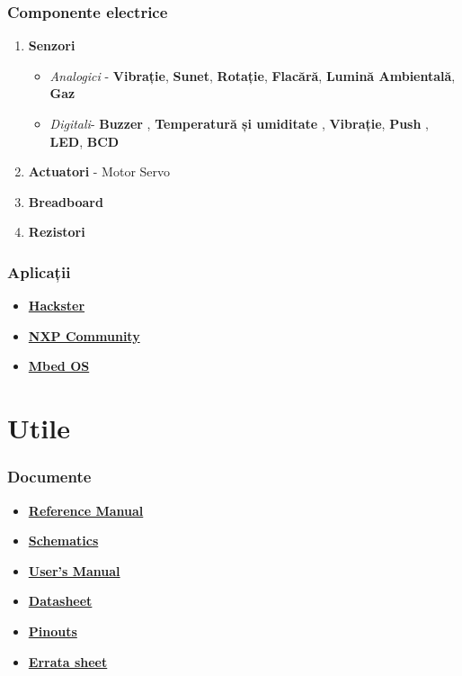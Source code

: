 \documentclass[xcolor={table}]{beamer}
\begin{document}
		\begin{frame}
			\frametitle{Componente electrice}
			\begin{enumerate}
				\item \textbf{Senzori}
					\begin{itemize}
				        \item \textit{Analogici} - 
				        \textbf{Vibrație},
				        \textbf{Sunet}, 
				        \textbf{Rotație}, 
				        \textbf{Flacără}, 
				        \textbf{Lumină Ambientală},
				        \textbf{Gaz}
				        \item \textit{Digitali}-
				        \textbf{Buzzer} ,
				        \textbf{Temperatură și umiditate} ,
				        \textbf{Vibrație}, 
				        \textbf{Push} ,
				        \textbf{LED},
				        \textbf{BCD} 
			        \end{itemize}
			    \item \textbf{Actuatori} - Motor Servo
				\item \textbf{Breadboard}
				\item \textbf{Rezistori}
			\end{enumerate}
		\end{frame}
		
		\begin{frame}
    		\frametitle{Aplicații}
    			\begin{itemize}
        			\item \href{https://www.hackster.io/projects/tags/microcontroller}{\textbf{Hackster}}
        			\item \href{https://community.nxp.com/}{\textbf{NXP Community}}
        			\item \href{https://os.mbed.com/platforms/KL25Z/}{\textbf{Mbed OS}}
    		    \end{itemize}
    	\end{frame}
	
	\section{Utile}
		
	\begin{frame}
		\frametitle{Documente}
			\begin{itemize}
    			\item \href{https://github.com/undacmic/MCULabs/blob/main/Resurse/FRDM-KL25Z_ReferenceManual.pdf}{\textbf{Reference Manual}}
    			\item \href{https://github.com/undacmic/MCULabs/blob/main/Resurse/FRDM-KL25Z_Schematics.pdf}{\textbf{Schematics}}
    			\item \href{https://github.com/undacmic/MCULabs/blob/main/Resurse/FRDM-KL25Z_UserManual.pdf}{\textbf{User's Manual}}
    			\item \href{https://github.com/undacmic/MCULabs/blob/main/Resurse/FRDM-KL25Z_Datasheet.pdf}{\textbf{Datasheet}}
    			\item \href{https://github.com/undacmic/MCULabs/blob/main/Resurse/FRDM-KL25Z_Pinouts.pdf}{\textbf{Pinouts}}
    			\item \href{https://github.com/undacmic/MCULabs/blob/main/Resurse/KINETIS_L_Errata.pdf}{\textbf{Errata sheet}}
		    \end{itemize}
	\end{frame}
\end{document}
